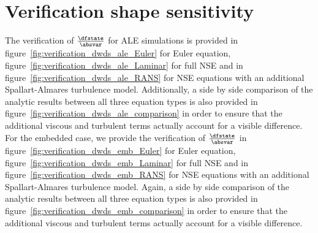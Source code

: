 \documentclass[../main.tex]{subfiles}
\begin{document}
\section{Verification shape sensitivity}
The verification of $\tfrac{\dfstate}{\absvar}$ for ALE simulations is provided in figure~\ref{fig:verification_dwds_ale_Euler} for Euler equation, figure~\ref{fig:verification_dwds_ale_Laminar} for full \ac{NSE} and in figure~\ref{fig:verification_dwds_ale_RANS} for \ac{NSE} equations with an additional Spallart-Almares turbulence model.
Additionally, a side by side comparison of the analytic results between all three equation types is also provided in figure~\ref{fig:verification_dwds_ale_comparison} in order to ensure that the additional viscous and turbulent terms actually account for a visible difference.
\\
For the embedded case, we provide the verification of $\tfrac{\dfstate}{\absvar}$  in figure~\ref{fig:verification_dwds_emb_Euler} for Euler equation, figure~\ref{fig:verification_dwds_emb_Laminar} for full \ac{NSE} and in figure~\ref{fig:verification_dwds_emb_RANS} for \ac{NSE} equations with an additional Spallart-Almares turbulence model.
Again, a side by side comparison of the analytic results between all three equation types is also provided in figure~\ref{fig:verification_dwds_emb_comparison} in order to ensure that the additional viscous and turbulent terms actually account for a visible difference.
\end{document}
